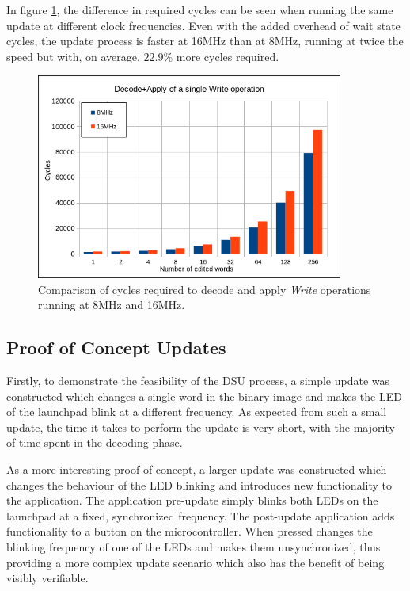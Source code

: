 In figure \ref{fig:w8vs16}, the difference in required cycles can be seen when running the same update at different clock frequencies. Even with the added overhead of wait state cycles, the update process is faster at 16MHz than at 8MHz, running at twice the speed but with, on average, $22.9\%$ more cycles required. 
\begin{figure}[!ht]
    \centering
    \includegraphics[width=0.9\textwidth]{img/W8vs16.png}
    \caption{Comparison of cycles required to decode and apply \textit{Write} operations running at 8MHz and 16MHz.}
    \label{fig:w8vs16}
\end{figure}
\subsection{Proof of Concept Updates}
Firstly, to demonstrate the feasibility of the DSU process, a simple update was constructed which changes a single word in the binary image and makes the LED of the launchpad blink at a different frequency. 
As expected from such a small update, the time it takes to perform the update is very short, with the majority of time spent in the decoding phase. 

As a more interesting proof-of-concept, a larger update was constructed which changes the behaviour of the LED blinking and introduces new functionality to the application. The application pre-update simply blinks both LEDs on the launchpad at a fixed, synchronized frequency. The post-update application adds functionality to a button on the microcontroller. When pressed changes the blinking frequency of one of the LEDs and makes them unsynchronized, thus providing a more complex update scenario which also has the benefit of being visibly verifiable. 

